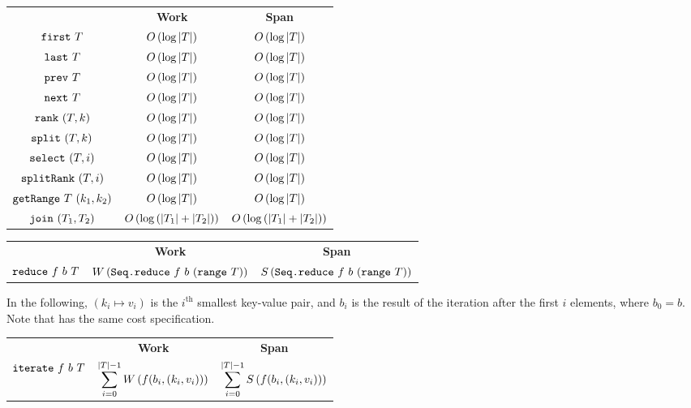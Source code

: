 \begin{costspec}
\begin{tabular}{c|c|c}
& \textbf{Work} & \textbf{Span} \\
$\texttt{first}~T$ & $O\left({\log|T|}\right)$ & $O\left({\log|T|}\right)$ \\
$\texttt{last}~T$ & $O\left({\log|T|}\right)$ & $O\left({\log|T|}\right)$ \\
$\texttt{prev}~T$ & $O\left({\log|T|}\right)$ & $O\left({\log|T|}\right)$ \\
$\texttt{next}~T$ & $O\left({\log|T|}\right)$ & $O\left({\log|T|}\right)$ \\
$\texttt{rank}~(T, k)$ & $O\left({\log|T|}\right)$ & $O\left({\log|T|}\right)$ \\
$\texttt{split}~(T, k)$ & $O\left({\log|T|}\right)$ & $O\left({\log|T|}\right)$ \\
$\texttt{select}~(T, i)$ & $O\left({\log|T|}\right)$ & $O\left({\log|T|}\right)$ \\
$\texttt{splitRank}~(T, i)$ & $O\left({\log|T|}\right)$ & $O\left({\log|T|}\right)$ \\
$\texttt{getRange}~T~(k_1, k_2)$ & $O\left({\log|T|}\right)$ & $O\left({\log|T|}\right)$
\\
$\texttt{join}~(T_1, T_2)$ &
$O\left({\log\left(|T_1| + |T_2|\right)}\right)$ &
$O\left({\log\left(|T_1| + |T_2|\right)}\right)$
\end{tabular}
\end{costspec}

\begin{costspec}[Reduce]
\begin{tabular}{c|c|c}
& \textbf{Work} & \textbf{Span} \\
$\texttt{reduce}~f~b~T$ &
$W\left({\texttt{Seq.reduce}~f~b~(\texttt{range}~T)}\right)$ &
$S\left({\texttt{Seq.reduce}~f~b~(\texttt{range}~T)}\right)$
\end{tabular}
\end{costspec}

\begin{costspec}[Iteration]
In the following, $(k_i \mapsto v_i)$ is the $i^\text{th}$ smallest key-value
pair, and $b_i$ is the result of the iteration after the first $i$ elements,
where $b_0 = b$. Note that  has the same cost specification.
\begin{tabular}{c|c|c}
& \textbf{Work} & \textbf{Span} \\
$\texttt{iterate}~f~b~T$ &
$\displaystyle\sum_{i=0}^{|T|-1} W\left({f(b_i, (k_i, v_i))}\right)$ &
$\displaystyle\sum_{i=0}^{|T|-1} S\left({f(b_i, (k_i, v_i))}\right)$
\end{tabular}
\end{costspec}

